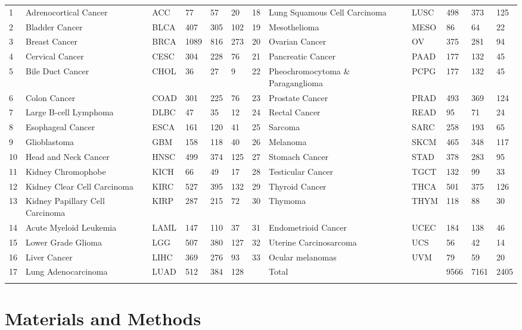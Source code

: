 \documentclass{bioinfo}
\begin{document}
\begin{table}[hbt]
{\begin{tabular}{@{}llllll|llllll@{}}
1	&	Adrenocortical Cancer	&	ACC	&	77	&	57	&	20	&	18	&	Lung Squamous Cell Carcinoma	&	LUSC	&	498	&	373	&	125	\\
2	&	Bladder Cancer	&	BLCA	&	407	&	305	&	102	&	19	&	Mesothelioma	&	MESO	&	86	&	64	&	22	\\
3	&	Breast Cancer	&	BRCA	&	1089	&	816	&	273	&	20	&	Ovarian Cancer	&	OV	&	375	&	281	&	94	\\
4	&	Cervical Cancer	&	CESC	&	304	&	228	&	76	&	21	&	Pancreatic Cancer	&	PAAD	&	177	&	132	&	45	\\
5	&	Bile Duct Cancer	&	CHOL	&	36	&	27	&	9	&	22	&	Pheochromocytoma \& Paraganglioma	&	PCPG	&	177	&	132	&	45	\\
6	&	Colon Cancer	&	COAD	&	301	&	225	&	76	&	23	&	Prostate Cancer	&	PRAD	&	493	&	369	&	124	\\
7	&	Large B-cell Lymphoma	&	DLBC	&	47	&	35	&	12	&	24	&	Rectal Cancer	&	READ	&	95	&	71	&	24	\\
8	&	Esophageal Cancer	&	ESCA	&	161	&	120	&	41	&	25	&	Sarcoma	&	SARC	&	258	&	193	&	65	\\
9	&	Glioblastoma	&	GBM	&	158	&	118	&	40	&	26	&	Melanoma	&	SKCM	&	465	&	348	&	117	\\
10	&	Head and Neck Cancer	&	HNSC	&	499	&	374	&	125	&	27	&	Stomach Cancer	&	STAD	&	378	&	283	&	95	\\
11	&	Kidney Chromophobe	&	KICH	&	66	&	49	&	17	&	28	&	Testicular Cancer	&	TGCT	&	132	&	99	&	33	\\
12	&	Kidney Clear Cell Carcinoma	&	KIRC	&	527	&	395	&	132	&	29	&	Thyroid Cancer	&	THCA	&	501	&	375	&	126	\\
13	&	Kidney Papillary Cell Carcinoma	&	KIRP	&	287	&	215	&	72	&	30	&	Thymoma	&	THYM	&	118	&	88	&	30	\\
14	&	Acute Myeloid Leukemia	&	LAML	&	147	&	110	&	37	&	31	&	Endometrioid Cancer	&	UCEC	&	184	&	138	&	46	\\
15	&	Lower Grade Glioma	&	LGG	&	507	&	380	&	127	&	32	&	Uterine Carcinosarcoma	&	UCS	&	56	&	42	&	14	\\
16	&	Liver Cancer	&	LIHC	&	369	&	276	&	93	&	33	&	Ocular melanomas	&	UVM	&	79	&	59	&	20	\\
17	&	Lung Adenocarcinoma	&	LUAD	&	512	&	384	&	128	&		&	Total	&		&	9566	&	7161	&	2405\\\botrule
\end{tabular}}{}
\end{table}


\section{Materials and Methods}
\end{document}
